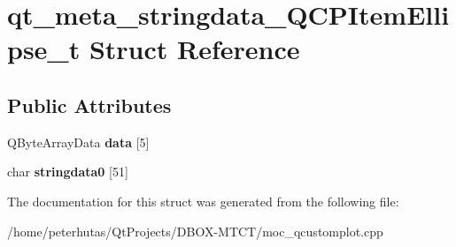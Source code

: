 \hypertarget{structqt__meta__stringdata___q_c_p_item_ellipse__t}{}\section{qt\+\_\+meta\+\_\+stringdata\+\_\+\+Q\+C\+P\+Item\+Ellipse\+\_\+t Struct Reference}
\label{structqt__meta__stringdata___q_c_p_item_ellipse__t}
\subsection*{Public Attributes}
\begin{DoxyCompactItemize}
\item 
\mbox{\label{structqt__meta__stringdata___q_c_p_item_ellipse__t_ac8506617981990ea7d33afbc41f97fd2}} 
Q\+Byte\+Array\+Data {\bfseries data} \mbox{[}5\mbox{]}
\item 
\mbox{\label{structqt__meta__stringdata___q_c_p_item_ellipse__t_a47fd49f50069acd98fc8a4f2dec3672a}} 
char {\bfseries stringdata0} \mbox{[}51\mbox{]}
\end{DoxyCompactItemize}


The documentation for this struct was generated from the following file\+:\begin{DoxyCompactItemize}
\item 
/home/peterhutas/\+Qt\+Projects/\+D\+B\+O\+X-\/\+M\+T\+C\+T/moc\+\_\+qcustomplot.\+cpp\end{DoxyCompactItemize}
